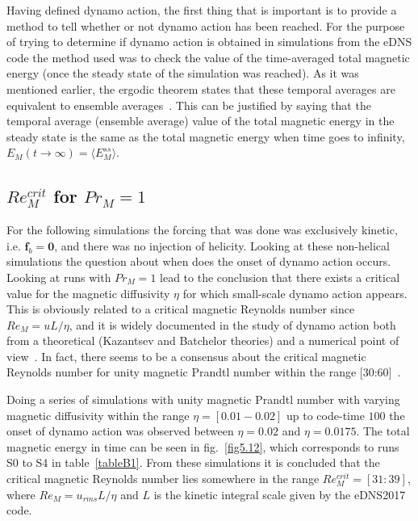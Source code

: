 \documentclass[12pt,a4paper]{report}
\begin{document}
Having defined dynamo action, the first thing that is important is to provide a method to tell whether or not dynamo action has been reached. For the purpose of trying to determine if dynamo action is obtained in simulations from the eDNS code the method used was to check the value of the time-averaged total magnetic energy (once the steady state of the simulation was reached). As it was mentioned earlier, the ergodic theorem states that these temporal averages are equivalent to ensemble averages~\cite{biskamp1997nonlinear}. This can be justified by saying that the temporal average (ensemble average) value of the total magnetic energy in the steady state is the same as the total magnetic energy when time goes to infinity, $E_M(t\rightarrow\infty)=\langle E_M^{ss} \rangle$.

\subsection{$Re_M^{crit}$ for $Pr_M=1$}
\label{subsec5.3.1}

For the following simulations the forcing that was done was exclusively kinetic, i.e. $\bm f_b = \bm 0$, and there was no injection of helicity. Looking at these non-helical simulations the question about when does the onset of dynamo action occurs. Looking at runs with $Pr_M = 1$ lead to the conclusion that there exists a critical value for the magnetic diffusivity $\eta$ for which small-scale dynamo action appears. This is obviously related to a critical magnetic Reynolds number since $Re_M=uL/\eta$, and it is widely documented in the study of dynamo action both from a theoretical (Kazantsev and Batchelor theories) and a numerical point of view~\cite{kazantsev1968enhancement, schekochihin2004critical, haugen2004simulations, batchelor1950spontaneous, schekochihin2007fluctuation, tobias2011mhd}. In fact, there seems to be a consensus about the critical magnetic Reynolds number for unity magnetic Prandtl number within the range [30:60]~\cite{brandenburg2005astrophysical, kazantsev1968enhancement}.

Doing a series of simulations with unity magnetic Prandtl number with varying magnetic diffusivity within the range $\eta=[0.01-0.02]$ up to code-time $100$ the onset of dynamo action was observed between $\eta=0.02$ and $\eta=0.0175$. The total magnetic energy in time can be seen in fig.~\ref{fig5.12}, which corresponds to runs S0 to S4 in table~\ref{tableB1}. From these simulations it is concluded that the critical magnetic Reynolds number lies somewhere in the range $Re_M^{crit}=[31:39]$, where $Re_M=u_{rms}L/\eta$ and $L$ is the kinetic integral scale given by the eDNS2017 code.
\end{document}
